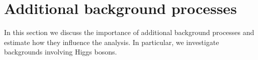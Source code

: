 
\chapter{Additional background processes}
\label{chapter:bkgHiggs}

In this section we discuss the importance of additional background processes and estimate how they influence the analysis. In particular, we investigate backgrounds involving Higgs bosons.

